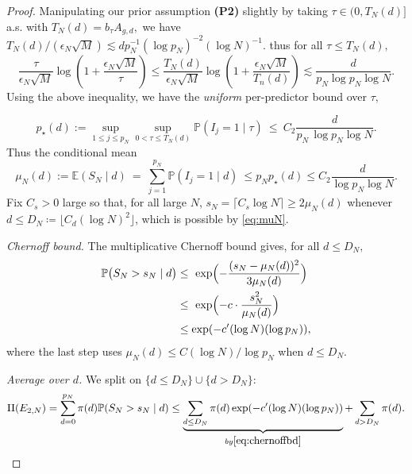 \documentclass[11pt]{article}
\theoremstyle{plain}
\theoremstyle{definition}
\theoremstyle{plain}
\begin{document}
\begin{proof}
Manipulating our prior assumption \textbf{(P2)} slightly by taking $\tau \in (0,T_N (d)]$ a.s. with $T_N(d)=b_{\tau} A_{g,d},$ we have $T_N(d)/(\epsilon_N \sqrt{M}) \lesssim d p_N^{-1} (\log p_N)^{-2} (\log N)^{-1}.$ thus for all $\tau \le T_N(d),$ 
\[
\frac{\tau}{\epsilon_N \sqrt{M}} \log \left(1+\frac{\epsilon_N \sqrt{M}}{\tau} \right) \le \frac{T_N(d)}{\epsilon_N \sqrt{M}} \log \left(1+\frac{\epsilon_N \sqrt{M}}{T_n(d)} \right) \lesssim \frac{d}{p_N \log p_N \log N}.
\]
Using the above inequality, we have the \emph{uniform} per-predictor bound over $\tau,$

\begin{equation}\label{eq:pstar}
p_\star(d):=\sup_{1\le j\le p_N}\sup_{0 < \tau \le T_N(d)} \mathbb P(I_j=1\mid \tau)
\ \le\ C_2\frac{d}{p_N\,\log p_N \log N}.
\end{equation}
Thus the conditional mean
\begin{equation}\label{eq:muN}
\mu_N(d) := \mathbb E(S_N\mid d)\ =\ \sum_{j=1}^{p_N}\mathbb P(I_j=1\mid d)\ \le p_N p_{\star}(d) \le C_2 \frac{d}{\log p_N \log N}.
\end{equation}
Fix $C_s >0$ large so that, for all large $N$, $s_N = \lceil C_s \log N \rceil \ge 2 \mu_{N}(d)$ whenever $d \le D_N \coloneqq \lfloor C_d (\log N)^2 \rfloor$, which is possible by \eqref{eq:muN}. 

\emph{Chernoff bound.}
The multiplicative Chernoff bound gives, for all $d \le D_N,$
\begin{equation}\label{eq:chernoffbd}
\begin{split}
\mathbb P\bigl(S_N> s_N\mid d\bigr) & \le\ \exp \Bigl(-\frac{(s_N-\mu_N (d))^2}{3\mu_N(d)}\Bigr) \\
& \le\ \exp \Bigl(-c\cdot\frac{s_N^2}{\mu_N(d)}\Bigr)\\
& \le \exp(-c'(\log N)(\log p_N)),
\end{split}    
\end{equation}
where the last step uses $\mu_N(d) \le C (\log N)/\log p_N$ when $d \le D_N$.

\emph{Average over $d$.} We split on $\{d \le D_N\} \cup \{d > D_N\}:$ 
\[
\Pi(E_{2,N}) = \sum_{d=0}^{p_N} \pi(d) \mathbb{P}(S_N > s_N \mid d) \le \underbrace{\sum_{d \le D_N} \pi(d) \exp(-c'(\log N)(\log p_N))}_{by \eqref{eq:chernoffbd}} + \sum_{d > D_N} \pi(d).
\]


\end{proof}
\end{document}
